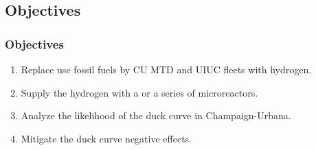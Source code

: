 \subsection{Objectives}
\begin{frame}
\frametitle{Objectives}
\centering
    \begin{enumerate}
    	\item Replace use fossil fuels by CU MTD and UIUC fleets with hydrogen.
    	\item Supply the hydrogen with a or a series of microreactors.
    	\item Analyze the likelihood of the duck curve in Champaign-Urbana.
        \item Mitigate the duck curve negative effects.
	\end{enumerate}
\end{frame}